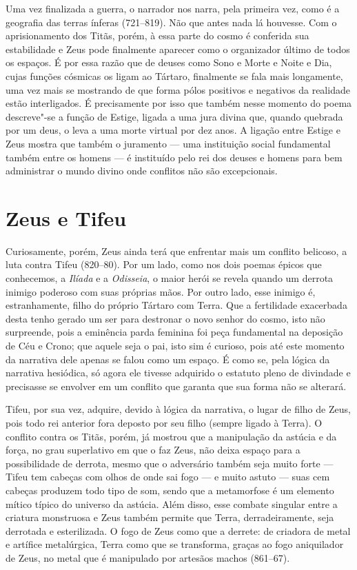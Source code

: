 Uma vez finalizada a guerra, o narrador nos narra, pela primeira vez,
como é a geografia das terras ínferas (721--819). Não que antes nada lá
houvesse. Com o aprisionamento dos Titãs, porém, à essa parte do cosmo é
conferida sua estabilidade e Zeus pode finalmente aparecer como o
organizador último de todos os espaços. É por essa razão que de deuses
como Sono e Morte e Noite e Dia, cujas funções cósmicas os ligam ao
Tártaro, finalmente se fala mais longamente, uma vez mais se mostrando
de que forma pólos positivos e negativos da realidade estão
interligados. É precisamente por isso que também nesse momento do poema
descreve"-se a função de Estige, ligada a uma jura divina que, quando
quebrada por um deus, o leva a uma morte virtual por dez anos. A ligação
entre Estige e Zeus mostra que também o juramento --- uma instituição
social fundamental também entre os homens --- é instituído pelo rei dos
deuses e homens para bem administrar o mundo divino onde conflitos não
são excepcionais.

\section{Zeus e Tifeu}

Curiosamente, porém, Zeus ainda terá que enfrentar mais um conflito
belicoso, a luta contra Tifeu (820--80). Por um lado, como nos dois
poemas épicos que conhecemos, a \emph{Ilíada} e a \emph{Odisseia}, o
maior herói se revela quando um derrota inimigo poderoso com suas
próprias mãos. Por outro lado, esse inimigo é, estranhamente, filho do
próprio Tártaro com Terra. Que a fertilidade exacerbada desta tenho
gerado um ser para destronar o novo senhor do cosmo, isto não
surpreende, pois a eminência parda feminina foi peça fundamental na
deposição de Céu e Crono; que aquele seja o pai, isto sim é curioso,
pois até este momento da narrativa dele apenas se falou como um espaço.
É como se, pela lógica da narrativa hesiódica, só agora ele tivesse
adquirido o estatuto pleno de divindade e precisasse se envolver em um
conflito que garanta que sua forma não se alterará.

Tifeu, por sua vez, adquire, devido à lógica da narrativa, o lugar de
filho de Zeus, pois todo rei anterior fora deposto por seu filho (sempre
ligado à Terra). O conflito contra os Titãs, porém, já mostrou que a
manipulação da astúcia e da força, no grau superlativo em que o faz
Zeus, não deixa espaço para a possibilidade de derrota, mesmo que o
adversário também seja muito forte --- Tifeu tem cabeças com olhos de
onde sai fogo --- e muito astuto --- suas cem cabeças produzem todo tipo
de som, sendo que a metamorfose é um elemento mítico típico do universo
da astúcia. Além disso, esse combate singular entre a criatura
monstruosa e Zeus também permite que Terra, derradeiramente, seja
derrotada e esterilizada. O fogo de Zeus como que a derrete: de criadora
de metal e artífice metalúrgica, Terra como que se transforma, graças ao
fogo aniquilador de Zeus, no metal que é manipulado por artesãos machos
(861--67).

